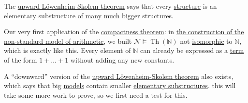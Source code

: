 \begin{intuition}
	The \hyperref[thm:upward-Lowenheim-Skolem]{upward Löwenheim-Skolem theorem} says that every \hyperref[def:structure]{structure} is an \hyperref[def:elementary-substructure]{elementary substructure} of many much bigger \hyperref[def:structure]{structures}.
\end{intuition}

\begin{prev}
	Our very first application of the \hyperref[thm:compactness]{compactness theorem}: in \hyperref[eg:construction-non-standard-model-of-arithmetic]{the construction of the non-standard model of arithmetic}, we built \(\mathcal{N} \models \mathop{\mathrm{Th}}(\mathbb{N} ) \) not \hyperref[def:isomorphism]{isomorphic} to \(\mathbb{N} \), which is exactly like this. Every element of \(\mathbb{N} \) can already be expressed as a \hyperref[def:term]{term} of the form \(1+\ldots +1\) without adding any new constants.
\end{prev}

A ``downward'' version of the \hyperref[thm:upward-Lowenheim-Skolem]{upward Löwenheim-Skolem theorem} also exists, which says that big \hyperref[def:model]{models} contain smaller \hyperref[def:elementary-substructure]{elementary substructures}. this will take some more work to prove, so we first need a test for this.

